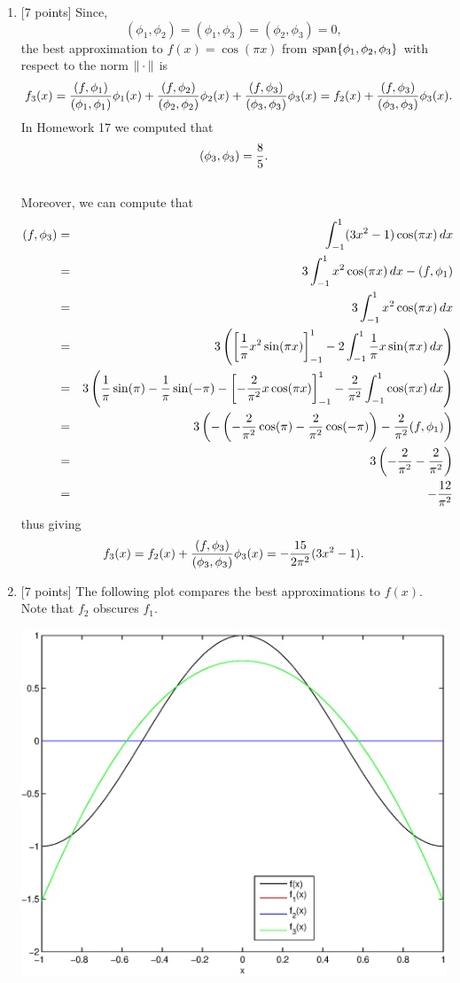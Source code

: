 \begin{solution}
\begin{enumerate}
\item {[7 points]}
Since,
 \[ (\phi_1,\phi_2) = (\phi_1,\phi_3) = (\phi_2,\phi_3) = 0,\]
the best approximation to $f(x) = \cos(\pi x)$ from ${\rm span}\{\phi_1,\phi_2,\phi_3\}$ with respect to the norm $\|\cdot\|$ is
       \[ f_3(x) = {(f,\phi_1) \over (\phi_1, \phi_1)} \phi_1(x) + {(f,\phi_2) \over (\phi_2, \phi_2)} \phi_2(x) + {(f,\phi_3) \over (\phi_3, \phi_3)} \phi_3(x) = f_2(x) + {(f,\phi_3) \over (\phi_3, \phi_3)} \phi_3(x).\]
In Homework 17 we computed that
\[
  (\phi_3,\phi_3) = {8\over 5}.
\]
\\
Moreover, we can compute that
\begin{eqnarray*}
  (f,\phi_3) &=& \int_{-1}^1 (3x^2-1)\cos(\pi x)\,dx
\\
 &=& 3\int_{-1}^1 x^2\cos(\pi x)\,dx-(f,\phi_1)
\\
 &=& 3\int_{-1}^1 x^2\cos(\pi x)\,dx
\\
 &=& 3\left(\left[\frac{1}{\pi}x^2\sin(\pi x)\right]_{-1}^1-2\int_{-1}^1 \frac{1}{\pi}x\sin(\pi x)\,dx\right)
\\
 &=& 3\left(\frac{1}{\pi}\sin(\pi)-\frac{1}{\pi}\sin(-\pi)-\left[-\frac{2}{\pi^2}x\cos(\pi x)\right]_{-1}^1-\frac{2}{\pi^2}\int_{-1}^1 \cos(\pi x)\,dx\right)
\\
 &=& 3\left(-\left(-\frac{2}{\pi^2}\cos(\pi )-\frac{2}{\pi^2}\cos(-\pi)\right)-\frac{2}{\pi^2}(f,\phi_1)\right)
\\
 &=& 3\left(-\frac{2}{\pi^2}-\frac{2}{\pi^2}\right)
\\
 &=& -\frac{12}{\pi^2}
\end{eqnarray*}
thus giving
       \[ f_3(x) = f_2(x) + {(f,\phi_3) \over (\phi_3, \phi_3)} \phi_3(x) = -\frac{15}{2\pi^2} (3x^2-1) .\]

\item {[7 points]} The following plot compares the best approximations to $f(x)$. Note that $f_2$ obscures $f_1$.

\begin{center} \includegraphics[scale=0.5]{hw18d} \end{center}


\end{enumerate}
\end{solution}
